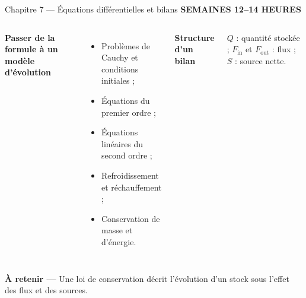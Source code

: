 \documentclass[aspectratio=169,10pt]{beamer}
\newcommand{\meta}[1]{{\small\bfseries\color{turquoise} #1}\par\vspace{0.07cm}}
\newcommand{\formule}[2]{\begin{tcolorbox}[colback=pale,colframe=pale]
  {\small\bfseries\color{bleu}#1}\par\vspace{0.13cm}
  \centering {\large\color{nuit}$\displaystyle #2$}\par
\end{tcolorbox}}
\newcommand{\takeaway}[1]{\vfill\begin{tcolorbox}[colback=palevert,colframe=palevert]
{\small\color{encre}\textbf{À retenir —} #1}\end{tcolorbox}}
\newcommand{\smalllist}{\setlength{\itemsep}{0.04cm}\setlength{\parskip}{0pt}}
\begin{document}
\begin{frame}{Chapitre 7 — Équations différentielles et bilans}
\meta{SEMAINES 12–14 \quad\textbullet{} HEURES}
\begin{columns}[T,onlytextwidth]
{\bfseries\color{nuit}Passer de la formule à un modèle d'évolution}
\begin{itemize}\smalllist
\item Problèmes de Cauchy et conditions initiales ;
\item Équations du premier ordre ;
\item Équations linéaires du second ordre ;
\item Refroidissement et réchauffement ;
\item Conservation de masse et d'énergie.
\end{itemize}
\formule{Structure d'un bilan}{\frac{dQ}{dt}=F_{\mathrm{in}}-F_{\mathrm{out}}+S}
\begin{tcolorbox}[colback=paleorange,colframe=paleorange]
\small $Q$ : quantité stockée ; $F_{\mathrm{in}}$ et $F_{\mathrm{out}}$ : flux ; $S$ : source nette.
\end{tcolorbox}
\end{columns}
\takeaway{Une loi de conservation décrit l'évolution d'un stock sous l'effet des flux et des sources.}
\end{frame}
\end{document}
